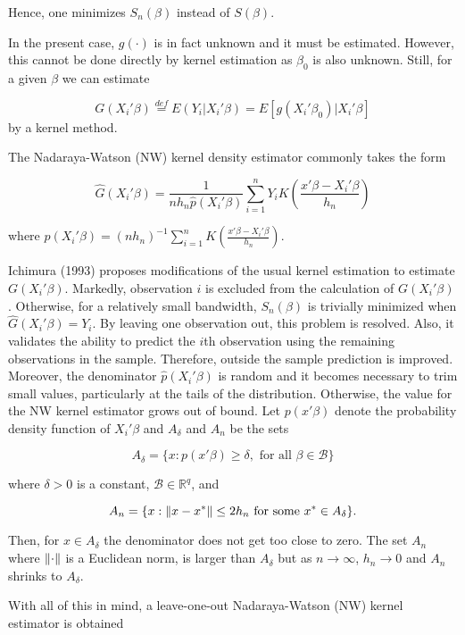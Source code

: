 Hence, one minimizes $S_n(\beta)$ instead of $S(\beta)$.


In the present case, $g(\cdot)$ is in fact unknown and it must be estimated. However, this cannot be done directly by kernel estimation as $\beta_0$ is also unknown. Still, for a given $\beta$ we can estimate

\begin{equation}
G(X_i'\beta) \stackrel{def}{=} E(Y_i|X_i'\beta) = E[g(X_i'\beta_0)|X_i'\beta]
\end{equation}
 by a kernel method. 

The Nadaraya-Watson (NW) kernel density estimator commonly takes the form

\[\hat{G}(X_i'\beta) = \frac{1}{nh_n\hat{p}(X_i'\beta)}\sum_{i=1}^{n}  Y_iK \left(\frac{x'\beta - X_i'\beta}{h_n}\right) \]

where $\hat{p}(X_i'\beta) = (nh_n)^{-1}\sum_{i=1}^{n}K\left(\frac{x'\beta - X_i'\beta}{h_n}\right)$.


Ichimura (1993) \cite{[6]} proposes modifications of the usual kernel estimation to estimate $G(X_i'\beta)$. Markedly, observation $i$ is excluded from the calculation of $G(X_i'\beta)$. Otherwise, for a relatively small bandwidth, $S_n(\beta)$ is trivially minimized when $\hat{G}(X_i'\beta) = Y_i$. By leaving one observation out, this problem is resolved. Also, it validates the ability to predict the $i$th observation using the remaining observations in the sample. Therefore, outside the sample prediction is improved. Moreover, the denominator $\hat{p}(X_i'\beta)$ is random and it becomes necessary to trim small values, particularly at the tails of the distribution. Otherwise, the value for the NW kernel estimator grows out of bound. Let $p(x'\beta)$ denote the probability density function of $X_i'\beta$ and $A_\delta$ and $A_n$ be the sets

\[ A_\delta = \{ x : p(x'\beta) \geq \delta, \text{ for all }  \beta \in \mathcal{B} \}
\]

where $\delta > 0$ is a constant, $\mathcal{B} \in \mathbb{R}^q$, and

\[ A_n = \{ x : \left\lVert x - x^*\right\rVert \leq 2h_n \text{ for some } x^* \in A_\delta\}.
\]

Then, for $x \in A_\delta$ the denominator does not get too close to zero. The set $A_n$ where $\left\lVert\cdot\right\rVert$ is a Euclidean norm, is larger than $A_\delta$ but as $ n \rightarrow \infty $, $h_n \rightarrow 0$ and $A_n$ shrinks to $A_\delta$. 

With all of this in mind, a leave-one-out Nadaraya-Watson (NW) kernel estimator is obtained

